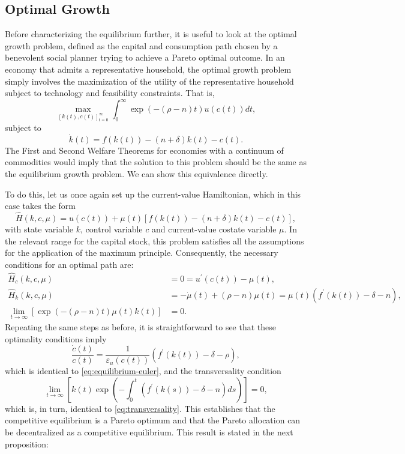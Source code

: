 \documentclass[\topdir/lecture\_notes.tex]{subfiles}
\begin{document}
\subsection{Optimal Growth}
Before characterizing the equilibrium further, it is useful to look at the optimal growth problem, defined as the capital and consumption path chosen by a benevolent social planner trying to achieve a Pareto optimal outcome.
In an economy that admits a representative household, the optimal growth problem simply involves the maximization of the utility of the representative household subject to technology and feasibility constraints.
That is,
\[
  \max _{[k(t), c(t)]_{t=0}^{\infty}} \int_{0}^{\infty} \exp(-(\rho-n) t) u(c(t)) dt,
\]
subject to
\begin{equation}
  \dot{k}(t)=f(k(t))-(n+\delta) k(t)-c(t).
  \label{eq:capital-dynamics}
\end{equation}
The First and Second Welfare Theorems for economies with a continuum of commodities would imply that the solution to this problem should be the same as the equilibrium growth problem.
We can show this equivalence directly.

To do this, let us once again set up the current-value Hamiltonian, which in this case takes the form
\[
  \hat{H}(k, c, \mu)=u(c(t))+\mu(t)[f(k(t))-(n+\delta) k(t)-c(t)],
\]
with state variable $k$, control variable $c$ and current-value costate variable $\mu$.
In the relevant range for the capital stock, this problem satisfies all the assumptions for the application of the maximum principle.
Consequently, the necessary conditions for an optimal path are:
\[
  \begin{aligned}
    \hat{H}_{c}(k, c, \mu)                                      & =0=u^{\prime}(c(t))-\mu(t),                                                  \\
    \hat{H}_{k}(k, c, \mu)                                      & =-\dot{\mu}(t)+(\rho-n) \mu(t)=\mu(t)\left(f^{\prime}(k(t))-\delta-n\right), \\
    \lim _{t \rightarrow \infty}[\exp(-(\rho-n) t) \mu(t) k(t)] & =0.
  \end{aligned}
\]
Repeating the same steps as before, it is straightforward to see that these optimality conditions imply
\[
  \frac{\dot{c}(t)}{c(t)}=\frac{1}{\varepsilon_{u}(c(t))}\left(f^{\prime}(k(t))-\delta-\rho\right),
\]
which is identical to \eqref{eq:equilibrium-euler}, and the transversality condition
\[
  \lim _{t \rightarrow \infty}\left[k(t) \exp \left(-\int_{0}^{t}\left(f^{\prime}(k(s))-\delta-n\right) ds\right)\right]=0,
\]
which is, in turn, identical to \eqref{eq:transversality}.
This establishes that the competitive equilibrium is a Pareto optimum and that the Pareto allocation can be decentralized as a competitive equilibrium.
This result is stated in the next proposition:
\end{document}
